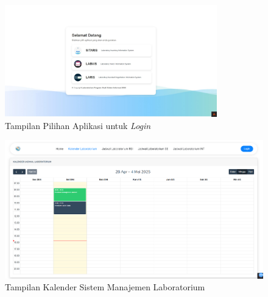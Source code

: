\begin{figure}
	\centering
	\includegraphics[width=0.82\textwidth]{konten/gambar/hasil/pilih-aplikasi.jpeg}
	\caption{Tampilan Pilihan Aplikasi untuk \textit{Login}}
	\label{fig:pilih-login}
\end{figure}

\begin{figure}[h]
	\centering
	\includegraphics[width=1\textwidth]{konten/gambar/hasil/kalender.png}
	\caption{Tampilan Kalender Sistem Manajemen Laboratorium}
	\label{fig:kalender}
\end{figure}

